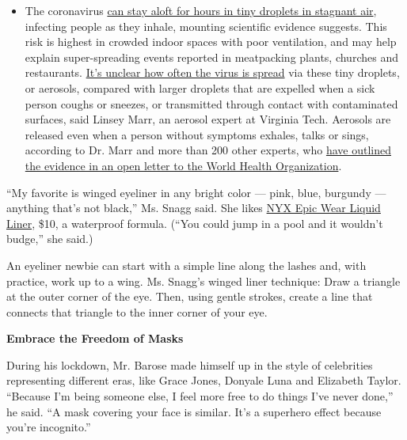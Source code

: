 \begin{itemize}
  \begin{itemize}
  \tightlist
  \item
    The coronavirus
    \href{https://www.nytimes.com/2020/07/04/health/239-experts-with-one-big-claim-the-coronavirus-is-airborne.html?action=click\&pgtype=Article\&state=default\&region=MAIN_CONTENT_3\&context=storylines_faq}{can
    stay aloft for hours in tiny droplets in stagnant air}, infecting
    people as they inhale, mounting scientific evidence suggests. This
    risk is highest in crowded indoor spaces with poor ventilation, and
    may help explain super-spreading events reported in meatpacking
    plants, churches and restaurants.
    \href{https://www.nytimes.com/2020/07/06/health/coronavirus-airborne-aerosols.html?action=click\&pgtype=Article\&state=default\&region=MAIN_CONTENT_3\&context=storylines_faq}{It's
    unclear how often the virus is spread} via these tiny droplets, or
    aerosols, compared with larger droplets that are expelled when a
    sick person coughs or sneezes, or transmitted through contact with
    contaminated surfaces, said Linsey Marr, an aerosol expert at
    Virginia Tech. Aerosols are released even when a person without
    symptoms exhales, talks or sings, according to Dr. Marr and more
    than 200 other experts, who
    \href{https://academic.oup.com/cid/article/doi/10.1093/cid/ciaa939/5867798}{have
    outlined the evidence in an open letter to the World Health
    Organization}.
  \end{itemize}
\end{itemize}

``My favorite is winged eyeliner in any bright color --- pink, blue,
burgundy --- anything that's not black,'' Ms. Snagg said. She likes
\href{https://www.nyxcosmetics.com/eyes/eyeliner/epic-wear-liquid-liner/NYX_806.html}{NYX
Epic Wear Liquid Liner}, \$10, a waterproof formula. (``You could jump
in a pool and it wouldn't budge,'' she said.)

An eyeliner newbie can start with a simple line along the lashes and,
with practice, work up to a wing. Ms. Snagg's winged liner technique:
Draw a triangle at the outer corner of the eye. Then, using gentle
strokes, create a line that connects that triangle to the inner corner
of your eye.

\textbf{Embrace the Freedom of Masks}

During his lockdown, Mr. Barose made himself up in the style of
celebrities representing different eras, like Grace Jones, Donyale Luna
and Elizabeth Taylor. ``Because I'm being someone else, I feel more free
to do things I've never done,'' he said. ``A mask covering your face is
similar. It's a superhero effect because you're incognito.''

